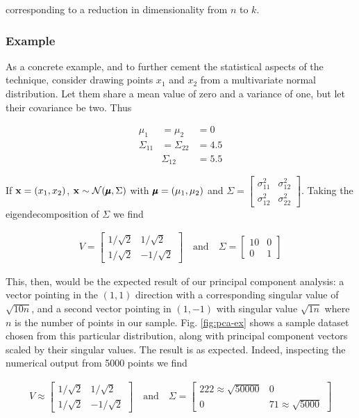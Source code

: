 corresponding to a reduction in dimensionality from $n$ to $k$.

\subsubsection{Example}

As a concrete example, and to further cement the statistical aspects
of the technique, consider drawing points $x_1$ and $x_2$ from a
multivariate normal distribution. Let them share a mean value of zero
and a variance of one, but let their covariance be two. Thus

\begin{align}
  \mu_1 &= \mu_2 &= 0 \\
  \Sigma_{11} &= \Sigma_{22} &= 4.5 \\
  &\Sigma_{12} &= 5.5
\end{align}

If $\mathbf{x} = (x_1, x_2)$, $\mathbf{x} \sim \mathcal{N}(\pmb{\mu}, \Sigma)$ with
$\pmb{\mu} = (\mu_1, \mu_2)$ and $\Sigma = \begin{bmatrix} \sigma_{11}^2 &
  \sigma_{12}^2 \\ \sigma_{12}^2 &
  \sigma_{22}^2 \end{bmatrix}$. Taking the eigendecomposition of
$\Sigma$ we find

\begin{align}
  V = \begin{bmatrix} 1/\sqrt{2} & 1/\sqrt{2} \\
    1/\sqrt{2} & - 1/\sqrt{2} 
  \end{bmatrix} \quad \mathrm{and} \quad
                 \Sigma = \begin{bmatrix} 10 & 0 \\
                   0 & 1 
                 \end{bmatrix}
\end{align}

This, then, would be the expected result of our principal component
analysis: a vector pointing in the $(1,1)$ direction with a
corresponding singular value of $\sqrt{10 n}$, and a second vector pointing in
$(1, -1)$ with singular value $\sqrt{1 n}$ where $n$ is the number of
points in our sample. Fig. \ref{fig:pca-ex} shows a
sample dataset chosen from this particular distribution, along with
principal component vectors scaled by their singular values. The
result is as expected. Indeed, inspecting the numerical output from
5000 points we find

\begin{align}
  V \approx \begin{bmatrix} 1/\sqrt{2} & 1/\sqrt{2} \\
    1/\sqrt{2} & - 1/\sqrt{2} 
  \end{bmatrix} \quad \mathrm{and} \quad
                 \Sigma = \begin{bmatrix} 222 \approx \sqrt{50000} & 0 \\
                   0 & 71 \approx \sqrt{5000}
                 \end{bmatrix}
\end{align}

